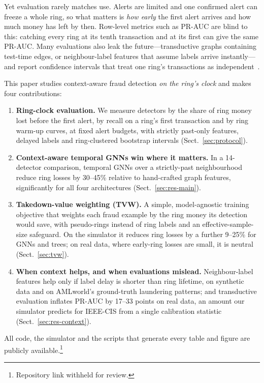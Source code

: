 \documentclass[10pt,letterpaper]{article}
\begin{document}
Yet evaluation rarely matches use. Alerts are limited and one confirmed alert can freeze a whole ring, so what matters is \emph{how early} the first alert arrives and how much money has left by then. Row-level metrics such as PR-AUC are blind to this: catching every ring at its tenth transaction and at its first can give the same PR-AUC. Many evaluations also leak the future---transductive graphs containing test-time edges, or neighbour-label features that assume labels arrive instantly---and report confidence intervals that treat one ring's transactions as independent~\cite{kapoor2023leakage,shchur2018pitfalls,poursafaei2022eval}.

This paper studies context-aware fraud detection \emph{on the ring's clock} and makes four contributions:
\begin{enumerate}
\item \textbf{Ring-clock evaluation.} We measure detectors by the share of ring money lost before the first alert, by recall on a ring's first transaction and by ring warm-up curves, at fixed alert budgets, with strictly past-only features, delayed labels and ring-clustered bootstrap intervals (Sect.~\ref{sec:protocol}).
\item \textbf{Context-aware temporal GNNs win where it matters.} In a 14-detector comparison, temporal GNNs over a strictly-past neighbourhood reduce ring losses by 30--45\% relative to hand-crafted graph features, significantly for all four architectures (Sect.~\ref{sec:res-main}).
\item \textbf{Takedown-value weighting (TVW).} A simple, model-agnostic training objective that weights each fraud example by the ring money its detection would save, with pseudo-rings instead of ring labels and an effective-sample-size safeguard. On the simulator it reduces ring losses by a further 9--25\% for GNNs and trees; on real data, where early-ring losses are small, it is neutral (Sect.~\ref{sec:tvw}).
\item \textbf{When context helps, and when evaluations mislead.} Neighbour-label features help only if label delay is shorter than ring lifetime, on synthetic data and on AMLworld's ground-truth laundering patterns; and transductive evaluation inflates PR-AUC by 17--33 points on real data, an amount our simulator predicts for IEEE-CIS from a single calibration statistic (Sect.~\ref{sec:res-context}).
\end{enumerate}
All code, the simulator and the scripts that generate every table and figure are publicly available.\footnote{Repository link withheld for review.}
\end{document}
